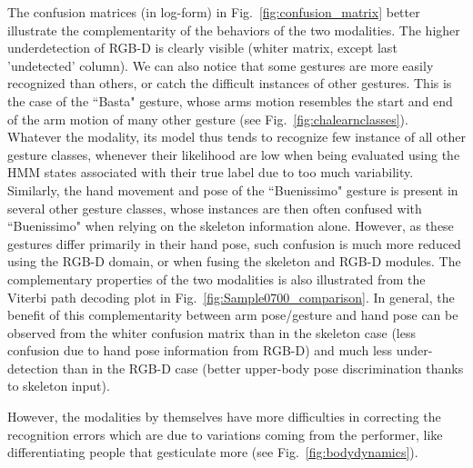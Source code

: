 %
The confusion matrices (in log-form)
 in Fig.~\ref{fig:confusion_matrix} better illustrate the complementarity of the behaviors of the two modalities.
%
The higher underdetection of RGB-D is clearly visible (whiter matrix, except last 'undetected' column).
%
We can also notice that some gestures are more easily recognized than others,
or catch the difficult instances of other gestures.
This is the case  of the ``Basta" gesture,
whose arms motion  resembles the  start and end of the arm motion of many other gesture (see Fig.~\ref{fig:chalearnclasses}).
Whatever the modality, its model thus tends to recognize few instance of all other gesture classes, whenever their
likelihood are low when being evaluated using the HMM states associated with their true label
due to too much variability.
%
Similarly, the hand movement and pose of the ``Buenissimo" gesture is present in several other gesture classes,
whose instances are then often confused with ``Buenissimo" when relying on the skeleton information alone.
%
However, as these gestures differ primarily in their hand pose, such confusion is much more reduced using the RGB-D domain,
or when fusing  the skeleton and RGB-D modules.
%
The complementary properties of the two modalities is also illustrated from the Viterbi path decoding plot in Fig.~\ref{fig:Sample0700_comparison}.
In general, the benefit of this complementarity between arm pose/gesture and hand pose
can be observed from the whiter confusion matrix than in the skeleton case (less confusion due to hand pose information from RGB-D)
and much less under-detection than in the RGB-D case (better upper-body pose discrimination thanks to skeleton input).
%

However, the modalities by themselves have more difficulties in correcting the recognition errors which are due to variations coming from the performer,
like differentiating  people that gesticulate more (see Fig.~\ref{fig:bodydynamics}).

